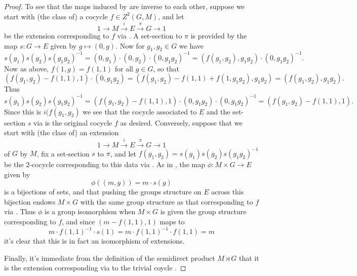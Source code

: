 \documentclass[11pt]{amsart}
\numberwithin{equation}{section}
\theoremstyle{remark}
\theoremstyle{remark}
\theoremstyle{remark}
\theoremstyle{definition}
\theoremstyle{definition}
\theoremstyle{definition}
\theoremstyle{definition}
\theoremstyle{definition}
\theoremstyle{definition}
\begin{document}
\begin{proof}
To see that the maps induced by  are inverse to each other, suppose we start with (the class of) a cocycle $f\in Z^2(G,M)$, and let 
\[1\longrightarrow M \stackrel{i}{\longrightarrow}E \stackrel{\pi}{\longrightarrow}G\longrightarrow 1\]
 be the extension corresponding to $f$ via . A set-section to $\pi$ is provided by the map $s:G\rightarrow E$ given by $g\mapsto (0,g)$. Now for $g_1,g_2\in G$ we have
 \[s(g_1)s(g_2)s(g_1g_2)^{-1}=(0,g_1)\cdot (0,g_2)\cdot (0,g_1g_2)^{-1}=\left(f(g_1,g_2),g_1g_2\right)\cdot \left(0,g_1g_2\right)^{-1}.\]
 Now as above, $f(1,g)=f(1,1)$ for all $g\in G$, so that
 \[\left(f(g_1,g_2)-f(1,1),1\right)\cdot \left(0,g_1g_2\right)=\left(f(g_1,g_2)-f(1,1)+f(1,g_1g_2),g_1g_2\right)=\left(f(g_1,g_2),g_1g_2\right).\]
 Thus
 \[s(g_1)s(g_2)s(g_1g_2)^{-1}=\left(f(g_1,g_2)-f(1,1),1\right)\cdot \left(0,g_1g_2\right)\cdot \left(0,g_1g_2\right)^{-1}=\left(f(g_1,g_2)-f(1,1),1\right).\]
 Since this is $i(f(g_1,g_2)$ we see that the cocycle associated to $E$ and the set-section $s$ via  is the original cocycle $f$ as desired. Conversely, suppose that we start with (the class of) an extension 
 \[1\longrightarrow M \stackrel{i}{\longrightarrow}E \stackrel{\pi}{\longrightarrow}G\longrightarrow 1\]
 of $G$ by $M$, fix a set-section $s$ to $\pi$, and let $f(g_1,g_2)=s(g_1)s(g_2)s(g_1g_2)^{-1}$ be the $2$-cocycle corresponding to this data via  . As in , the map $\phi: M\times G \rightarrow E $ given by 
\[\phi\left((m,g)\right)= m\cdot s(g)\]
is a bijections of sets, and that pushing the groups structure on $E$ across this bijection endows $M\times G$  with the same group structure as that corresponding to $f$ via . Thus $\phi$ is a group isomorphism when $M\times G$ is given the group structure corresponding to $f$, and since $(m-f(1,1),1)$ maps to \[m\cdot f(1,1)^{-1} \cdot s(1)=m\cdot f(1,1)^{-1}\cdot f(1,1)=m\]  it's clear that this is in fact an isomorphism of extensions.

Finally, it's immediate from the definition of the semidirect product $M\rtimes G$ that it is the extension corresponding via  to the trivial coycle .
\end{proof}
\end{document}

